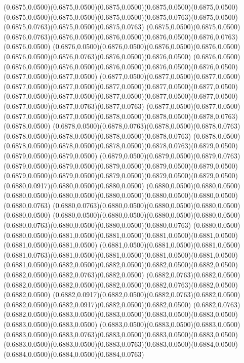 (0.6875,0.0500)(0.6875,0.0500)(0.6875,0.0500)(0.6875,0.0500)(0.6875,0.0500)
\PST@Solid(0.6875,0.0500)(0.6875,0.0500)(0.6875,0.0500)(0.6875,0.0763)(0.6875,0.0500)(0.6875,0.0763)(0.6875,0.0500)(0.6875,0.0763)
(0.6875,0.0500)(0.6875,0.0500)(0.6876,0.0763)(0.6876,0.0500)(0.6876,0.0500)(0.6876,0.0500)(0.6876,0.0763)(0.6876,0.0500)
(0.6876,0.0500)(0.6876,0.0500)(0.6876,0.0500)(0.6876,0.0500)(0.6876,0.0500)(0.6876,0.0763)(0.6876,0.0500)(0.6876,0.0500)
(0.6876,0.0500)(0.6876,0.0500)(0.6876,0.0500)(0.6876,0.0500)(0.6876,0.0500)(0.6876,0.0500)(0.6877,0.0500)(0.6877,0.0500)
(0.6877,0.0500)(0.6877,0.0500)(0.6877,0.0500)(0.6877,0.0500)(0.6877,0.0500)(0.6877,0.0500)(0.6877,0.0500)(0.6877,0.0500)
(0.6877,0.0500)(0.6877,0.0500)(0.6877,0.0500)(0.6877,0.0500)(0.6877,0.0500)(0.6877,0.0500)(0.6877,0.0763)(0.6877,0.0763)
(0.6877,0.0500)(0.6877,0.0500)(0.6877,0.0500)(0.6877,0.0500)(0.6878,0.0500)(0.6878,0.0500)(0.6878,0.0763)(0.6878,0.0500)
(0.6878,0.0500)(0.6878,0.0763)(0.6878,0.0500)(0.6878,0.0763)(0.6878,0.0500)(0.6878,0.0500)(0.6878,0.0500)(0.6878,0.0763)
(0.6878,0.0500)(0.6878,0.0500)(0.6878,0.0500)(0.6878,0.0500)(0.6878,0.0763)(0.6879,0.0500)(0.6879,0.0500)(0.6879,0.0500)
(0.6879,0.0500)(0.6879,0.0500)(0.6879,0.0763)(0.6879,0.0500)(0.6879,0.0500)(0.6879,0.0500)(0.6879,0.0500)(0.6879,0.0500)
(0.6879,0.0500)(0.6879,0.0500)(0.6879,0.0500)(0.6879,0.0500)(0.6879,0.0500)(0.6880,0.0917)(0.6880,0.0500)(0.6880,0.0500)
(0.6880,0.0500)(0.6880,0.0500)(0.6880,0.0500)(0.6880,0.0500)(0.6880,0.0500)(0.6880,0.0500)(0.6880,0.0500)(0.6880,0.0763)
(0.6880,0.0763)(0.6880,0.0500)(0.6880,0.0500)(0.6880,0.0500)(0.6880,0.0500)
\PST@Solid(0.6880,0.0500)(0.6880,0.0500)(0.6880,0.0500)(0.6880,0.0500)(0.6880,0.0763)(0.6880,0.0500)(0.6880,0.0500)(0.6880,0.0763)
(0.6880,0.0500)(0.6880,0.0500)(0.6881,0.0500)(0.6881,0.0500)(0.6881,0.0500)(0.6881,0.0500)(0.6881,0.0500)(0.6881,0.0500)
(0.6881,0.0500)(0.6881,0.0500)(0.6881,0.0500)(0.6881,0.0763)(0.6881,0.0500)(0.6881,0.0500)(0.6881,0.0500)(0.6881,0.0500)
(0.6881,0.0500)(0.6882,0.0500)(0.6882,0.0500)(0.6882,0.0500)(0.6882,0.0500)(0.6882,0.0500)(0.6882,0.0763)(0.6882,0.0500)
(0.6882,0.0763)(0.6882,0.0500)(0.6882,0.0500)(0.6882,0.0500)(0.6882,0.0500)(0.6882,0.0763)(0.6882,0.0500)(0.6882,0.0500)
(0.6882,0.0917)(0.6882,0.0500)(0.6882,0.0763)(0.6882,0.0500)(0.6882,0.0500)(0.6882,0.0917)(0.6882,0.0500)(0.6882,0.0500)
(0.6882,0.0763)(0.6882,0.0500)(0.6883,0.0500)(0.6883,0.0500)(0.6883,0.0500)(0.6883,0.0500)(0.6883,0.0500)(0.6883,0.0500)
(0.6883,0.0500)(0.6883,0.0500)(0.6883,0.0500)(0.6883,0.0500)(0.6883,0.0763)(0.6883,0.0500)(0.6883,0.0500)(0.6883,0.0500)
(0.6883,0.0500)(0.6883,0.0500)(0.6883,0.0763)(0.6883,0.0500)(0.6884,0.0500)(0.6884,0.0500)(0.6884,0.0500)(0.6884,0.0763)
